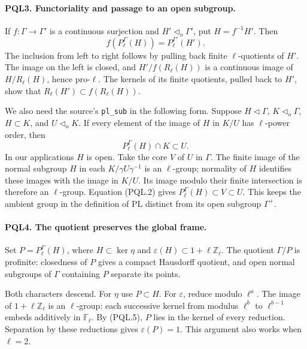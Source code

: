 \paragraph{PQL3. Functoriality and passage to an open subgroup.}
\label{claim:PQL3}
If \(f:\Gamma\to\Gamma'\) is a continuous surjection and
\(H'\triangleleft_o\Gamma'\), put \(H=f^{-1}H'\). Then
\[
 f(P_\ell^\Gamma(H))=P_\ell^{\Gamma'}(H').             \tag{PQL.6}
\]
The inclusion from left to right follows by pulling back finite
\(\ell\)-quotients of \(H'\). The image on the left is closed,
and \(H'/f(R_\ell(H))\) is a continuous image of
\(H/R_\ell(H)\), hence pro-\(\ell\). The kernels of its
finite quotients, pulled back to \(H'\), show that
\(R_\ell(H')\subset f(R_\ell(H))\).

We also need the source's \texttt{pl\_sub} in the following form.
Suppose \(H\triangleleft\Gamma\), \(K\triangleleft_o\Gamma\),
\(H\subset K\), and \(U\triangleleft_oK\). If every element
of the image of \(H\) in \(K/U\) has \(\ell\)-power order, then
\[
 P_\ell^\Gamma(H)\cap K\subset U.                    \tag{PQL.7}
\]
In our applications \(H\) is open. Take the core \(V\) of
\(U\) in \(\Gamma\). The finite image of the normal subgroup
\(H\) in each \(K/\gamma U\gamma^{-1}\) is an \(\ell\)-group;
normality of \(H\) identifies these images with the image
in \(K/U\). Its image modulo their finite intersection is
therefore an \(\ell\)-group. Equation (PQL.2) gives
\(P_\ell^\Gamma(H)\subset V\subset U\).
This keeps the ambient group in the definition of
\(\mathrm{PL}\) distinct from its open subgroup \(\Gamma^+\).

\paragraph{PQL4. The quotient preserves the global frame.}
\label{claim:PQL4}
Set \(P=P_\ell^\Gamma(H)\), where \(H\subset\ker\eta\) and
\(\varepsilon(H)\subset1+\ell\mathbb Z_\ell\).
The quotient \(\Gamma/P\) is profinite: closedness of \(P\)
gives a compact Hausdorff quotient, and open normal subgroups
of \(\Gamma\) containing \(P\) separate its points.

Both characters descend. For \(\eta\) use \(P\subset H\).
For \(\varepsilon\), reduce modulo \(\ell^a\).
The image of \(1+\ell\mathbb Z_\ell\) is an \(\ell\)-group:
each successive kernel from modulus \(\ell^b\) to
\(\ell^{b-1}\) embeds additively in \(\mathbb F_\ell\).
By (PQL.5), \(P\) lies in the kernel of every reduction.
Separation by these reductions gives \(\varepsilon(P)=1\).
This argument also works when \(\ell=2\).

